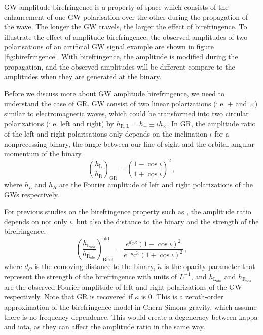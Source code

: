 \documentclass[twocolumn]{aastex631}
\begin{document}
GW amplitude birefringence is a property of space which consists of the enhancement of one GW polarisation over the other during the propagation of the wave.
The longer the GW travels, the larger the effect of birefringence.
To illustrate the effect of amplitude birefringence,
the observed amplitudes of two polarisations of an artificial GW signal example are shown in figure \ref{fig:birefringence}.
With birefringence, the amplitude is modified during the propagation,
and the observed amplitudes will be different compare to the amplitudes when they are generated at the binary.

Before we discuss more about GW amplitude birefringence, we need to understand the case of GR.
GW consist of two linear polarizations (i.e. $+$ and $\times$) similar to electromagnetic waves,
which could be transformed into two circular polarizations (i.e. left and right) by $h_{\mathrm{R}, \mathrm{L}} = h_+ \pm i h_\times$.
In GR, the amplitude ratio of the left and right polarisations only depends on the inclination $\iota$ for a nonprecessing binary,
the angle between our line of sight and the orbital angular momentum of the binary.
\begin{equation}
    \left(\frac{h_\mathrm{L}}{h_\mathrm{R}}\right)_\mathrm{GR}=\left(\frac{1-\cos\iota}{1+\cos\iota}\right)^2\,,
\end{equation}where $h_L$ and $h_R$ are the Fourier amplitude of left and right polarizations of the GWs respectively.

For previous studies on the birefringence property such as \citet{Maria_2021}, the amplitude ratio depends on not only $\iota$,
but also the distance to the binary and the strength of the birefringence.
\begin{equation}
    \left(\frac{h_\mathrm{L_{obs}}}{h_\mathrm{R_{obs}}}\right)_\mathrm{Biref}^\mathrm{old}=\frac{e^{d_C\widetilde{\kappa}}\left(1-\cos\iota\right)^2}{e^{-d_C\widetilde{\kappa}}\left(1+\cos\iota\right)^2}\,,
\end{equation}where $d_C$ is the comoving distance to the binary, $\widetilde{\kappa}$ is the opacity parameter that represent
the strength of the birefringence with units of $L^{-1}$, and $h_\mathrm{L_{obs}}$ and $h_\mathrm{R_{obs}}$ are
the observed Fourier amplitude of left and right polarizations of the GW respectively. Note that GR is recovered if $\kappa$ is $0$.
This is a zeroth-order approximation of the birefringence model in Chern-Simons gravity, which assume there is no frequency dependence.
This would create a degeneracy between kappa and iota, as they can affect the amplitude ratio in the same way.
\end{document}
